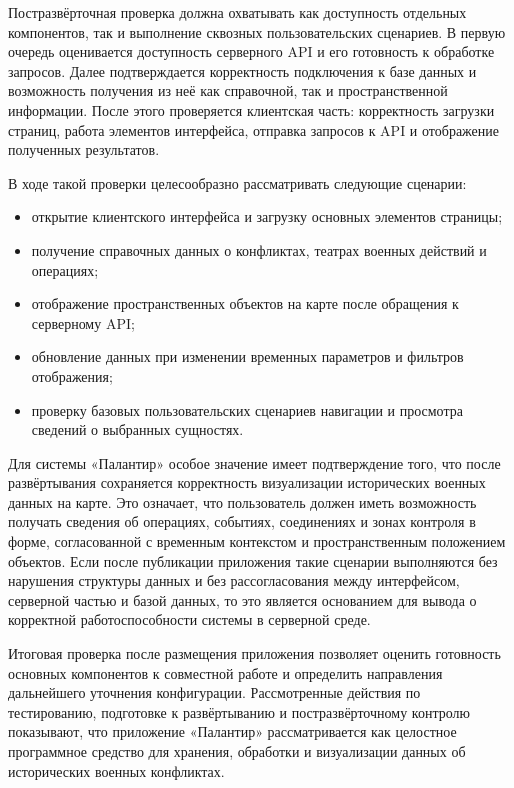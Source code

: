 Постразвёрточная проверка должна охватывать как доступность отдельных компонентов, так и выполнение сквозных пользовательских сценариев. В первую очередь оценивается доступность серверного API и его готовность к обработке запросов. Далее подтверждается корректность подключения к базе данных и возможность получения из неё как справочной, так и пространственной информации. После этого проверяется клиентская часть: корректность загрузки страниц, работа элементов интерфейса, отправка запросов к API и отображение полученных результатов.

В ходе такой проверки целесообразно рассматривать следующие сценарии:
\begin{itemize}
\item открытие клиентского интерфейса и загрузку основных элементов страницы;
\item получение справочных данных о конфликтах, театрах военных действий и операциях;
\item отображение пространственных объектов на карте после обращения к серверному API;
\item обновление данных при изменении временных параметров и фильтров отображения;
\item проверку базовых пользовательских сценариев навигации и просмотра сведений о выбранных сущностях.
\end{itemize}

Для системы «Палантир» особое значение имеет подтверждение того, что после развёртывания сохраняется корректность визуализации исторических военных данных на карте. Это означает, что пользователь должен иметь возможность получать сведения об операциях, событиях, соединениях и зонах контроля в форме, согласованной с временным контекстом и пространственным положением объектов. Если после публикации приложения такие сценарии выполняются без нарушения структуры данных и без рассогласования между интерфейсом, серверной частью и базой данных, то это является основанием для вывода о корректной работоспособности системы в серверной среде.

Итоговая проверка после размещения приложения позволяет оценить готовность основных компонентов к совместной работе и определить направления дальнейшего уточнения конфигурации. Рассмотренные действия по тестированию, подготовке к развёртыванию и постразвёрточному контролю показывают, что приложение «Палантир» рассматривается как целостное программное средство для хранения, обработки и визуализации данных об исторических военных конфликтах.
